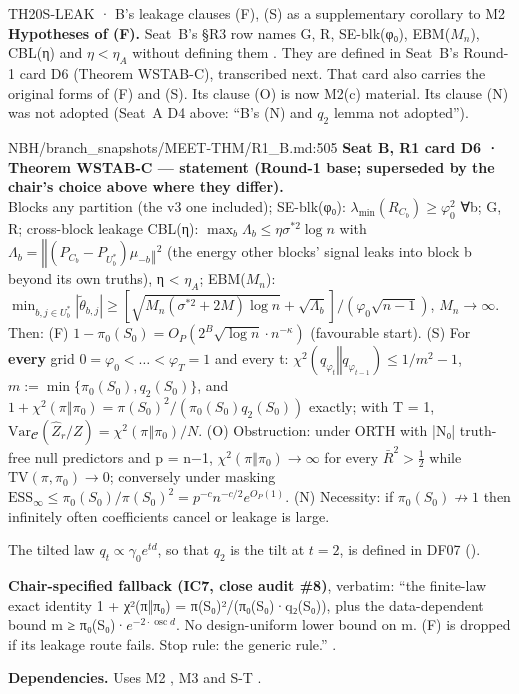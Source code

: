 \begin{card}{TH20}{S-LEAK · B's leakage clauses (F), (S) as a supplementary corollary to M2}
\textbf{Hypotheses of (F).} Seat~B's §R3 row names G, R, SE-blk(φ₀), EBM($M_n$), CBL(η) and $η<η_A$ without defining them . They are defined in Seat~B's Round-1 card D6 (Theorem WSTAB-C), transcribed next. That card also carries the original forms of (F) and (S). Its clause (O) is now M2(c) material. Its clause (N) was not adopted (Seat~A D4 above: ``B's (N) and $q_2$ lemma not adopted'').
\begin{stmt}{NBH/branch_snapshots/MEET-THM/R1_B.md:505}
\textbf{Seat B, R1 card D6 · Theorem WSTAB-C — statement (Round-1 base; superseded by the chair's choice above where they differ).}\\
Blocks any partition (the v3 one included); SE-blk(φ₀): $λ_{\min}(R_{C_b}) ≥ φ_0^2$ ∀b; G, R; cross-block leakage CBL(η): $\max_b Λ_b ≤ ησ^{*2}\log n$ with $Λ_b = ‖(P_{C_b} − P_{U^*_b})μ_{−b}‖^2$ (the energy other blocks' signal leaks into block b beyond its own truths), η < $η_A$; EBM($M_n$): $\min_{b,j∈U^*_b}|\tilde{θ}_{b,j}| ≥ [\sqrt{M_n(σ^{*2}+2M)\log n} + \sqrt{Λ_b}]/(φ_0\sqrt{n−1})$, $M_n → ∞$. Then: (F) $1 − π_0(S_0) = O_P(2^B\sqrt{\log n}\cdot n^{−κ})$ (favourable start). (S) For \textbf{every} grid $0 = φ_0 < … < φ_T = 1$ and every t: $χ^2(q_{φ_t}‖q_{φ_{t−1}}) ≤ 1/m^2 − 1$, $m := \min\{π_0(S_0), q_2(S_0)\}$, and $1 + χ^2(π‖π_0) = π(S_0)^2/(π_0(S_0)q_2(S_0))$ exactly; with T = 1, $\mathrm{Var}_{𝓒}(\hat{Z}_r/Z) = χ^2(π‖π_0)/N$. (O) Obstruction: under ORTH with |N₀| truth-free null predictors and p = n−1, $χ^2(π‖π_0) → ∞$ for every $\bar{R}^2 > \tfrac12$ while $\mathrm{TV}(π, π_0) → 0$; conversely under masking $\mathrm{ESS}_∞ ≤ π_0(S_0)/π(S_0)^2 = p^{−c}n^{−c/2}e^{O_P(1)}$. (N) Necessity: if $π_0(S_0) \not\to 1$ then infinitely often coefficients cancel or leakage is large.
\end{stmt}
The tilted law $q_t\propto\gamma_0e^{td}$, so that $q_2$ is the tilt at $t=2$, is defined in DF07 ().

\textbf{Chair-specified fallback (IC7, close audit \#8)}, verbatim: ``the finite-law exact identity 1 + χ²(π‖π₀) = π(S₀)²/(π₀(S₀)·q₂(S₀)), plus the data-dependent bound m ≥ π₀(S₀)·$e^{−2\cdot\operatorname{osc} d}$. No design-uniform lower bound on m. (F) is dropped if its leakage route fails. Stop rule: the generic rule.'' .

\textbf{Dependencies.} Uses M2 , M3  and S-T  .


\end{card}

